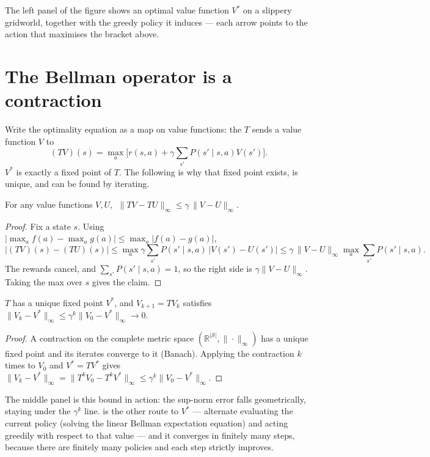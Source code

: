 \documentclass[11pt]{article}
\begin{document}
The left panel of the figure shows an optimal value function $V^*$ on a
slippery gridworld, together with the greedy policy it induces --- each arrow
points to the action that maximises the bracket above.

\section{The Bellman operator is a contraction}

Write the optimality equation as a map on value functions: the  $T$ sends a value function $V$ to
\[
  (TV)(s) = \max_a\Big[r(s,a) + \gamma\sum_{s'}P(s'\mid s,a)V(s')\Big].
\]
$V^*$ is exactly a fixed point of $T$. The following is why that fixed point
exists, is unique, and can be found by iterating.

\begin{theorem}
For any value functions $V,U$, $\;\|TV - TU\|_\infty \le \gamma\,\|V-U\|_\infty$.
\end{theorem}
\begin{proof}
Fix a state $s$. Using $|\max_a f(a)-\max_a g(a)|\le \max_a|f(a)-g(a)|$,
\[
  |(TV)(s)-(TU)(s)|
  \le \max_a \gamma\sum_{s'}P(s'\mid s,a)\,|V(s')-U(s')|
  \le \gamma\,\|V-U\|_\infty \max_a\sum_{s'}P(s'\mid s,a).
\]
The rewards cancel, and $\sum_{s'}P(s'\mid s,a)=1$, so the right side is
$\gamma\|V-U\|_\infty$. Taking the max over $s$ gives the claim.
\end{proof}

\begin{theorem}
$T$ has a unique fixed point $V^*$, and $V_{k+1}=TV_k$ satisfies
$\|V_k-V^*\|_\infty \le \gamma^k\|V_0-V^*\|_\infty \to 0$.
\end{theorem}
\begin{proof}
A contraction on the complete metric space $(\mathbb{R}^{|\mathcal{S}|},
\|\cdot\|_\infty)$ has a unique fixed point and its iterates converge to it
(Banach). Applying the contraction $k$ times to $V_0$ and $V^*=TV^*$ gives
$\|V_k-V^*\|_\infty=\|T^kV_0 - T^kV^*\|_\infty\le\gamma^k\|V_0-V^*\|_\infty$.
\end{proof}

The middle panel is this bound in action: the sup-norm error falls geometrically,
staying under the $\gamma^k$ line.  is the other route
to $V^*$ --- alternate evaluating the current policy (solving the linear Bellman
expectation equation) and acting greedily with respect to that value --- and it
converges in finitely many steps, because there are finitely many policies and
each step strictly improves.
\end{document}
